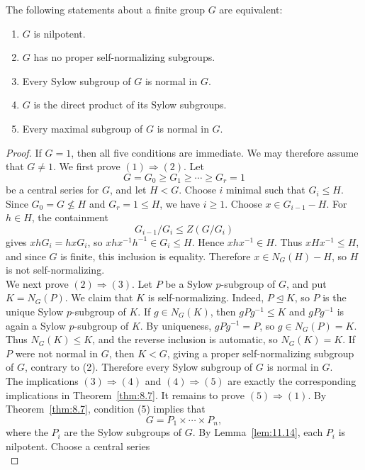 \documentclass[../Odyssey_Project.tex]{subfiles}
\begin{document}
\begin{theorem}
\label{thm:11.15}
The following statements about a finite group $G$ are equivalent:
\begin{enumerate}
    \item[(1)] $G$ is nilpotent.
    \item[(2)] $G$ has no proper self-normalizing subgroups.
    \item[(3)] Every Sylow subgroup of $G$ is normal in $G$.
    \item[(4)] $G$ is the direct product of its Sylow subgroups.
    \item[(5)] Every maximal subgroup of $G$ is normal in $G$.
\end{enumerate}
\end{theorem}
\begin{proof}
    If $G=1$, then all five conditions are immediate. We may therefore assume that $G\neq 1$. We first prove $(1)\Rightarrow(2)$. Let
    \[
        G=G_0\geq G_1\geq \cdots \geq G_r=1
    \]
    be a central series for $G$, and let $H<G$. Choose $i$ minimal such that $G_i\leq H$. Since $G_0=G\nleq H$ and $G_r=1\leq H$, we have $i\geq 1$. Choose $x\in G_{i-1}-H$. For $h\in H$, the containment
    \[
        G_{i-1}/G_i\leq Z(G/G_i)
    \]
    gives $xhG_i=hxG_i$, so $xhx^{-1}h^{-1}\in G_i\leq H$. Hence $xhx^{-1}\in H$. Thus $xHx^{-1}\leq H$, and since $G$ is finite, this inclusion is equality. Therefore $x\in N_G(H)-H$, so $H$ is not self-normalizing.\\
    We next prove $(2)\Rightarrow(3)$. Let $P$ be a Sylow $p$-subgroup of $G$, and put $K=N_G(P)$. We claim that $K$ is self-normalizing. Indeed, $P\trianglelefteq K$, so $P$ is the unique Sylow $p$-subgroup of $K$. If $g\in N_G(K)$, then $gPg^{-1}\leq K$ and $gPg^{-1}$ is again a Sylow $p$-subgroup of $K$. By uniqueness, $gPg^{-1}=P$, so $g\in N_G(P)=K$. Thus $N_G(K)\leq K$, and the reverse inclusion is automatic, so $N_G(K)=K$. If $P$ were not normal in $G$, then $K<G$, giving a proper self-normalizing subgroup of $G$, contrary to (2). Therefore every Sylow subgroup of $G$ is normal in $G$.\\
    The implications $(3)\Rightarrow(4)$ and $(4)\Rightarrow(5)$ are exactly the corresponding implications in Theorem~\ref{thm:8.7}. It remains to prove $(5)\Rightarrow(1)$. By Theorem~\ref{thm:8.7}, condition (5) implies that
    \[
        G=P_1\times \cdots \times P_n,
    \]
    where the $P_i$ are the Sylow subgroups of $G$. By Lemma~\ref{lem:11.14}, each $P_i$ is nilpotent. Choose a central series
    \[
\]
\end{proof}
\end{document}

